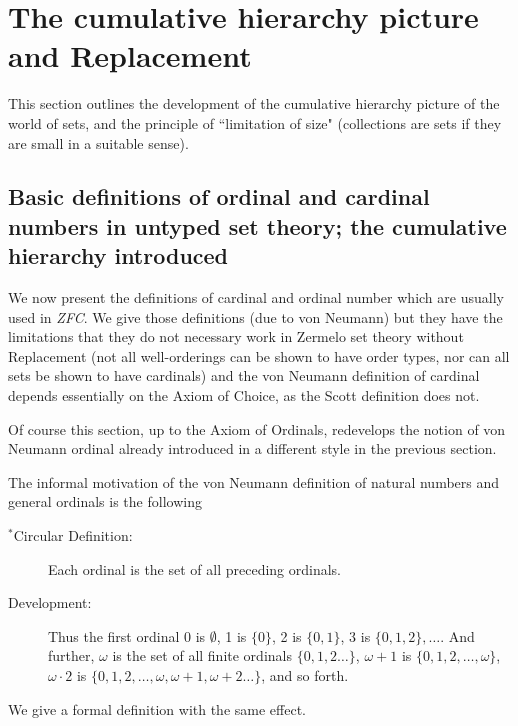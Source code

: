 \documentclass[12pt]{book}
\begin{document}
\newpage

\section{The cumulative hierarchy picture and Replacement}

This section outlines the development of the cumulative hierarchy picture of the world of sets, and the principle of ``limitation of size" (collections are sets if they are small in a suitable sense).

\subsection{Basic definitions of ordinal and cardinal numbers in untyped set theory; the cumulative hierarchy introduced}

We now present the definitions of cardinal and ordinal number which are
usually used in {\em ZFC\/}.  We give those definitions (due to von
Neumann) but they have the limitations that they do not necessary work
in Zermelo set theory without Replacement (not all well-orderings can
be shown to have order types, nor can all sets be shown to have
cardinals) and the von Neumann definition of cardinal depends
essentially on the Axiom of Choice, as the Scott definition does not.

Of course this section, up to the Axiom of Ordinals, redevelops the notion of von Neumann ordinal already introduced in a different style in the previous section.

The informal motivation of the von Neumann definition of natural numbers and general ordinals is the following

\begin{description}

\item[$^*$Circular Definition:]  Each ordinal is the set of all preceding ordinals.

\item[Development:]  Thus the first ordinal 0 is $\emptyset$, 1 is $\{0\}$, 2 is $\{0,1\}$, 3 is $\{0,1,2\}, \ldots$.  And further, $\omega$ is the set of all finite ordinals
$\{0,1,2\ldots\}$, $\omega+1$ is $\{0,1,2,\ldots,\omega\}$, $\omega \cdot 2$ is  $\{0,1,2,\ldots,\omega, \omega+1,\omega+2\ldots\}$, and so forth.

\end{description}

We give a formal definition with the same effect.
\end{document}
